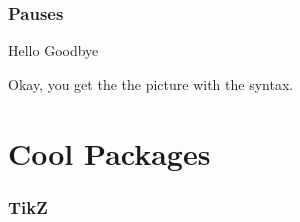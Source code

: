 \documentclass[12pt]{beamer}
\begin{document}
\begin{frame}[fragile]
\frametitle{Pauses}
Hello
\pause
Goodbye
\end{frame}
\begin{frame}[plain]
\centerline{Okay, you get the the picture with the syntax.}
\end{frame}
\section{Cool Packages}

\begin{frame}[plain]
\frametitle{TikZ}

\end{frame}


\end{document}
